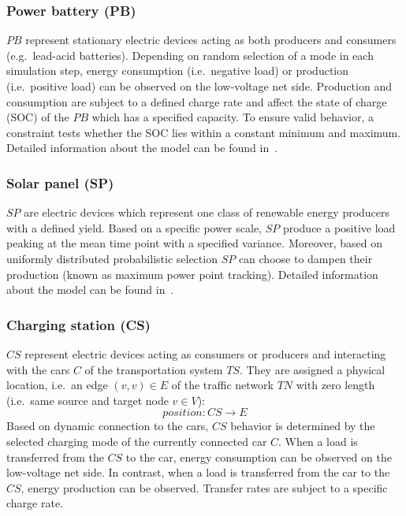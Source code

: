 \subsubsection*{Power battery (PB)}

$PB$ represent stationary electric devices acting as both producers and consumers (e.g.\ lead-acid batteries). 
Depending on random selection of a mode in each simulation step, energy consumption (i.e.\ negative load) or production (i.e.\ positive load) can be observed on the low-voltage net side. Production and consumption are subject to a defined charge rate and affect the state of charge (SOC) of the $PB$ which has a specified capacity.
To ensure valid behavior, a constraint tests whether the SOC lies within a constant minimum and maximum. Detailed information about the model can be found in~\cite{hackenberg2014rapid}.

\subsubsection*{Solar panel (SP)}

$SP$ are electric devices which represent one class of renewable energy producers with a defined yield. Based on a specific power scale, $SP$ produce a positive load peaking at the mean time point with a specified variance. Moreover, based on uniformly distributed probabilistic selection $SP$ can choose to dampen their production (known as maximum power point tracking). Detailed information about the model can be found in~\cite{hackenberg2014rapid}.

\subsubsection*{Charging station (CS)}
\label{section:charging_station}

$CS$ represent electric devices acting as consumers or producers and interacting with the cars $C$ of the transportation system $TS$. They are assigned a physical location, i.e.\ an edge $(v,v) \in E$ of the traffic network $TN$ with zero length (i.e.\ same source and target node $v \in V$):
$$\mathit{position}: CS \to E$$ 
 Based on dynamic connection to the cars, $CS$ behavior is determined by the selected charging mode of the currently connected car $C$. 
 When a load is transferred from the $CS$ to the car, energy consumption can be observed on the low-voltage net side. In contrast, when a load is transferred from the car to the $CS$, energy production can be observed. Transfer rates are subject to a specific charge rate.